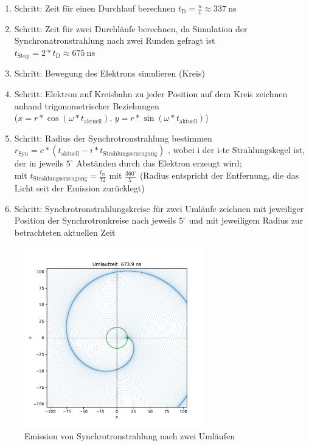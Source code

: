 \documentclass[11pt,a4paper]{article}
\begin{document}
        \begin{enumerate}
            \item Schritt: Zeit für einen Durchlauf berechnen \( t_{\mathrm{D}} = \frac{u}{v} \approx \SI{337}{\nano\second}\) 
            \item Schritt: Zeit für zwei Durchläufe berechnen, da Simulation der Synchronatronstrahlung nach zwei Runden gefragt ist \\
            \( t_{\mathrm{Stop}} = 2*t_{\mathrm{D}} \approx \SI{675}{\nano\second}\) 
            \item Schritt: Bewegung des Elektrons simulieren (Kreis)
            \item Schritt: Elektron auf Kreisbahn zu jeder Position auf dem Kreis zeichnen anhand trigonometrischer Beziehungen \\
            (\( x = r * \cos(\omega * t_{ \mathrm{aktuell} } ) , \, y = r * \sin(\omega * t_{ \mathrm{aktuell} } ) \))
            \item Schritt: Radius der Synchrotronstrahlung bestimmen \\
            \( r_{\mathrm{Syn}} = c*(t_{ \mathrm{aktuell} } - i * t_{ \mathrm{Strahlungserzeugung} } ) \) , 
            wobei i der i-te Strahlungskegel ist, der in jeweils \( 5 ^\circ\) Abständen durch das Elektron erzeugt wird; \\
            mit \( t_{\mathrm{Strahlungserzeugung}} = \frac{t_{\mathrm{D}}}{72} \) mit \( \frac{360 ^\circ}{5 ^\circ} \) 
            (Radius entspricht der Entfernung, die das Licht seit der Emission zurücklegt)
            \item Schritt: Synchrotronstrahlungskreise für zwei Umläufe zeichnen mit jeweiliger Position der Synchrotronkreise 
            nach jeweils \( 5 ^\circ\) und mit jeweiligem Radius zur betrachteten aktuellen Zeit 
        \end{enumerate}

        \begin{figure}[h]
            \centering
            \includegraphics[width=0.7\textwidth]{synchrotron-0673.9.pdf}
            \caption{Emission von Synchrotronstrahlung nach zwei Umläufen}
        \end{figure}
\end{document}

